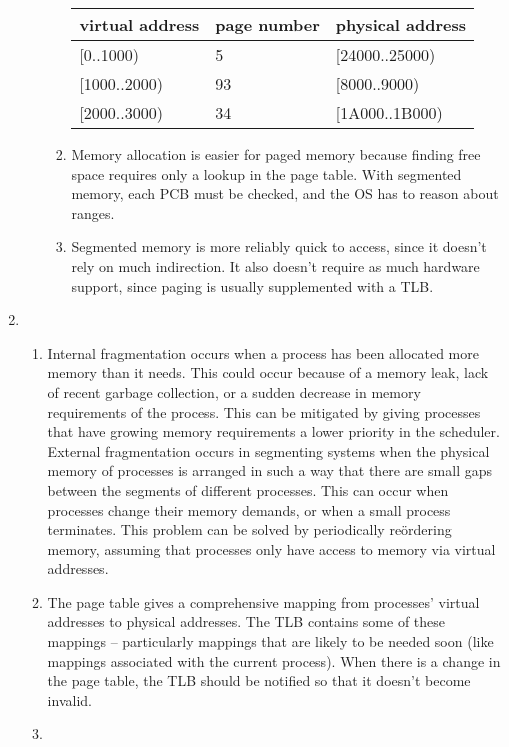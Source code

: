 \documentclass[11pt]{article}
\begin{document}
\begin{enumerate}
\begin{enumerate}
\begin{enumerate}
      \begin{tabular}{l|l|l}
        virtual address & page number & physical address\\
        \hline
        [0..1000) & 5 & [24000..25000)\\ \relax
        [1000..2000) & 93 & [8000..9000)\\ \relax
        [2000..3000) & 34 & [1A000..1B000)\\
      \end{tabular}
    \item Memory allocation is easier for paged memory because finding free space requires only a lookup in the page table. With segmented memory, each PCB must be checked, and the OS has to reason about ranges.
    \item Segmented memory is more reliably quick to access, since it doesn't rely on much indirection. It also doesn't require as much hardware support, since paging is usually supplemented with a TLB.
    \end{enumerate}
  \end{enumerate}
\item
  \begin{enumerate}
  \item Internal fragmentation occurs when a process has been allocated more memory than it needs. This could occur because of a memory leak, lack of recent garbage collection, or a sudden decrease in memory requirements of the process. This can be mitigated by giving processes that have growing memory requirements a lower priority in the scheduler. External fragmentation occurs in segmenting systems when the physical memory of processes is arranged in such a way that there are small gaps between the segments of different processes. This can occur when processes change their memory demands, or when a small process terminates. This problem can be solved by periodically re\"ordering memory, assuming that processes only have access to memory via virtual addresses.
  \item The page table gives a comprehensive mapping from processes' virtual addresses to physical addresses. The TLB contains some of these mappings -- particularly mappings that are likely to be needed soon (like mappings associated with the current process). When there is a change in the page table, the TLB should be notified so that it doesn't become invalid.
  \item
    \leavevmode\vadjust{\vspace{-\baselineskip}}\newline

\end{enumerate}
\end{enumerate}
\end{document}
